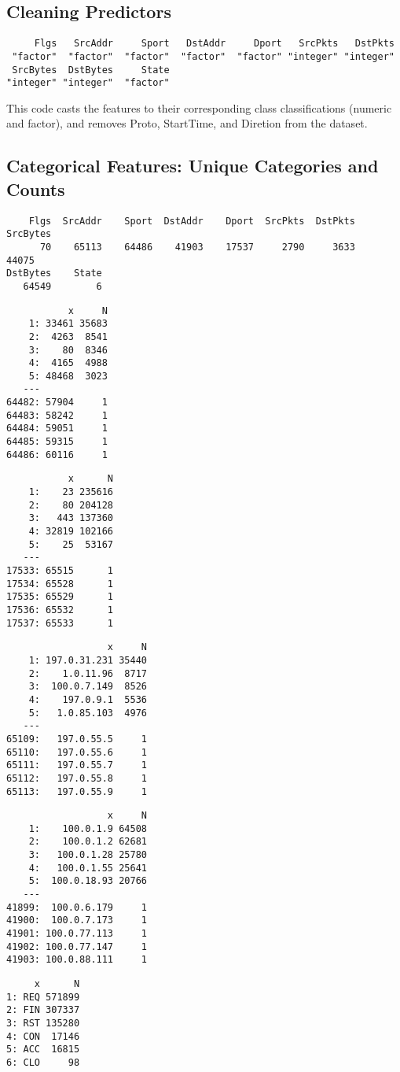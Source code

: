 \documentclass[12pt,twoside]{dukestatscithesis}
\theoremstyle{definition}
\theoremstyle{definition}
\theoremstyle{definition}
\theoremstyle{remark}
\begin{document}
\subsection{Cleaning Predictors}\label{cleaning-predictors}
\begin{verbatim}
     Flgs   SrcAddr     Sport   DstAddr     Dport   SrcPkts   DstPkts 
 "factor"  "factor"  "factor"  "factor"  "factor" "integer" "integer" 
 SrcBytes  DstBytes     State 
"integer" "integer"  "factor" 
\end{verbatim}
This code casts the features to their corresponding class
classifications (numeric and factor), and removes Proto, StartTime, and
Diretion from the dataset.

\subsection{Categorical Features: Unique Categories and
Counts}\label{categorical-features-unique-categories-and-counts}
\begin{verbatim}
    Flgs  SrcAddr    Sport  DstAddr    Dport  SrcPkts  DstPkts SrcBytes 
      70    65113    64486    41903    17537     2790     3633    44075 
DstBytes    State 
   64549        6 
\end{verbatim}
\begin{verbatim}
           x     N
    1: 33461 35683
    2:  4263  8541
    3:    80  8346
    4:  4165  4988
    5: 48468  3023
   ---            
64482: 57904     1
64483: 58242     1
64484: 59051     1
64485: 59315     1
64486: 60116     1
\end{verbatim}
\begin{verbatim}
           x      N
    1:    23 235616
    2:    80 204128
    3:   443 137360
    4: 32819 102166
    5:    25  53167
   ---             
17533: 65515      1
17534: 65528      1
17535: 65529      1
17536: 65532      1
17537: 65533      1
\end{verbatim}
\begin{verbatim}
                  x     N
    1: 197.0.31.231 35440
    2:    1.0.11.96  8717
    3:  100.0.7.149  8526
    4:    197.0.9.1  5536
    5:   1.0.85.103  4976
   ---                   
65109:   197.0.55.5     1
65110:   197.0.55.6     1
65111:   197.0.55.7     1
65112:   197.0.55.8     1
65113:   197.0.55.9     1
\end{verbatim}
\begin{verbatim}
                  x     N
    1:    100.0.1.9 64508
    2:    100.0.1.2 62681
    3:   100.0.1.28 25780
    4:   100.0.1.55 25641
    5:  100.0.18.93 20766
   ---                   
41899:  100.0.6.179     1
41900:  100.0.7.173     1
41901: 100.0.77.113     1
41902: 100.0.77.147     1
41903: 100.0.88.111     1
\end{verbatim}
\begin{verbatim}
     x      N
1: REQ 571899
2: FIN 307337
3: RST 135280
4: CON  17146
5: ACC  16815
6: CLO     98
\end{verbatim}
\end{document}
